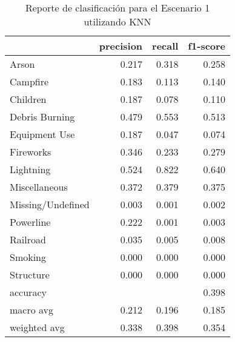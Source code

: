 \begin{table}
\centering
\caption{Reporte de clasificación para el Escenario 1 utilizando KNN}
\label{tab:KNN_Escenario 1}
\begin{tabular}{lrrr}
\toprule
{} &  precision &  recall &  f1-score \\
\midrule
Arson             &      0.217 &   0.318 &     0.258 \\
Campfire          &      0.183 &   0.113 &     0.140 \\
Children          &      0.187 &   0.078 &     0.110 \\
Debris Burning    &      0.479 &   0.553 &     0.513 \\
Equipment Use     &      0.187 &   0.047 &     0.074 \\
Fireworks         &      0.346 &   0.233 &     0.279 \\
Lightning         &      0.524 &   0.822 &     0.640 \\
Miscellaneous     &      0.372 &   0.379 &     0.375 \\
Missing/Undefined &      0.003 &   0.001 &     0.002 \\
Powerline         &      0.222 &   0.001 &     0.003 \\
Railroad          &      0.035 &   0.005 &     0.008 \\
Smoking           &      0.000 &   0.000 &     0.000 \\
Structure         &      0.000 &   0.000 &     0.000 \\
accuracy          &            &         &     0.398 \\
macro avg         &      0.212 &   0.196 &     0.185 \\
weighted avg      &      0.338 &   0.398 &     0.354 \\
\bottomrule
\end{tabular}
\end{table}
